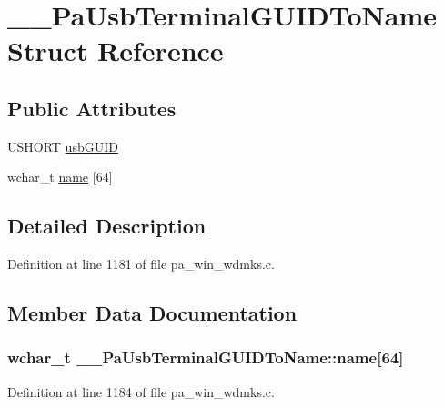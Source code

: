 \hypertarget{struct_____pa_usb_terminal_g_u_i_d_to_name}{}\section{\+\_\+\+\_\+\+Pa\+Usb\+Terminal\+G\+U\+I\+D\+To\+Name Struct Reference}
\label{struct_____pa_usb_terminal_g_u_i_d_to_name}
\subsection*{Public Attributes}
\begin{DoxyCompactItemize}
\item 
U\+S\+H\+O\+RT \hyperlink{struct_____pa_usb_terminal_g_u_i_d_to_name_afab660656e1e36e90d94c3e41cff7abc}{usb\+G\+U\+ID}
\item 
wchar\+\_\+t \hyperlink{struct_____pa_usb_terminal_g_u_i_d_to_name_afc7ab982a1c89a1ad640e40ad26d5f90}{name} \mbox{[}64\mbox{]}
\end{DoxyCompactItemize}


\subsection{Detailed Description}


Definition at line 1181 of file pa\+\_\+win\+\_\+wdmks.\+c.



\subsection{Member Data Documentation}
\subsubsection[{\texorpdfstring{name}{name}}]{\setlength{\rightskip}{0pt plus 5cm}wchar\+\_\+t \+\_\+\+\_\+\+Pa\+Usb\+Terminal\+G\+U\+I\+D\+To\+Name\+::name\mbox{[}64\mbox{]}}\hypertarget{struct_____pa_usb_terminal_g_u_i_d_to_name_afc7ab982a1c89a1ad640e40ad26d5f90}{}\label{struct_____pa_usb_terminal_g_u_i_d_to_name_afc7ab982a1c89a1ad640e40ad26d5f90}


Definition at line 1184 of file pa\+\_\+win\+\_\+wdmks.\+c.

